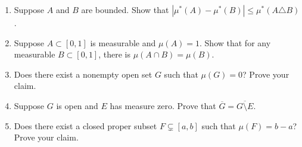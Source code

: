 \documentclass{article}
\begin{document}
\begin{enumerate}



\item Suppose $A$ and $B$ are bounded. Show that $| \mu^{*}(A) - \mu^{*}(B) | \le \mu^{*} (A \triangle B)$.





\item Suppose $A \subset [0,1]$ is measurable and $ \mu(A) = 1$. Show that for any measurable $B \subset [0,1]$, there is $\mu (A \cap B) = \mu (B)$.





\item Does there exist a nonempty open set $G$ such that $\mu(G)=0$? Prove your claim.





\item Suppose $G$ is open and $E$ has measure zero. Prove that $\overline{G} = \overline{G \setminus E}$.





\item Does there exist a closed proper subset $F \subsetneq [a,b]$ such that $\mu(F) = b-a$? Prove your claim.




\end{enumerate}
\end{document}
